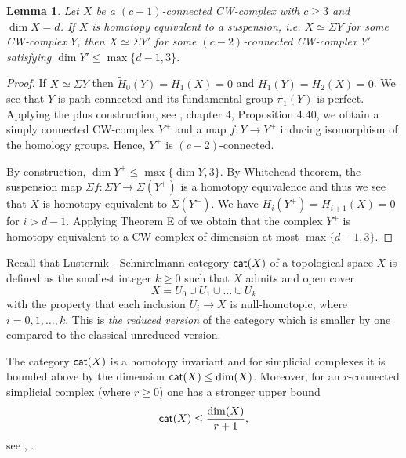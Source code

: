 \documentclass[11pt,twoside, reqno]{amsart}
\theoremstyle{plain}
\newtheorem{lema}{Lemma}
\theoremstyle{definition}
\newcommand{\cat}{{\sf{cat}}}
\begin{document}
\begin{lema}\label{lm1b}
Let $X$ be a $(c-1)$-connected CW-complex with $c\ge 3$ and $\dim X = d$. 
If $X$ is homotopy equivalent to a suspension, i.e. $X\simeq \Sigma Y$ for some CW-complex $Y$, 
then $X\simeq \Sigma Y'$ for some $(c-2)$-connected
CW-complex $Y'$ satisfying 
$\dim Y'\le \max\{d-1, 3\}$. 
\end{lema}
\begin{proof}
If $X\simeq \Sigma Y$ then $\tilde H_0(Y)= H_1(X)=0$ and $H_1(Y)= H_2(X)=0$. We see that $Y$ is path-connected and its fundamental group 
$\pi_1(Y)$ is perfect. Applying the plus construction, see \cite{Hatcher}, chapter 4, Proposition 4.40, we obtain a simply connected CW-complex 
$Y^+$ and a map $f: Y\to Y^+$ inducing isomorphism of the homology groups. Hence, $Y^+$ is $(c-2)$-connected. 

By construction, $\dim Y^+\le \max\{\dim Y, 3\}$. 
By Whitehead theorem, the suspension map $\Sigma f: \Sigma Y\to \Sigma (Y^+)$ is a homotopy equivalence and thus we see that $X$ is homotopy equivalent to $\Sigma (Y^+)$. We have $H_i(Y^+)=H_{i+1}(X)=0$ for $i>d-1$. Applying Theorem E of \cite{Wall} we obtain that the complex $Y^+$ is homotopy equivalent to a CW-complex of dimension at most $\max\{d-1, 3\}$. 
\end{proof}

Recall that  Lusternik - Schnirelmann category $\cat(X)$ of a topological space $X$ 
is defined as the smallest integer $k\ge 0$ such that $X$ admits and open cover 
$$X=U_0\cup U_1\cup \dots\cup U_k$$ with the property that each inclusion $U_i\to X$ is null-homotopic, where $i=0, 1, \dots, k$.  
This is {\it the reduced version} of the category which is smaller by one compared to the classical unreduced version. 

The category $\cat(X)$ is a homotopy invariant and for simplicial complexes it is bounded above by the dimension $\cat(X)\le \dim(X)$. Moreover, for an $r$-connected simplicial complex (where $r\ge 0$) one has a stronger upper bound
\begin{eqnarray}\label{dimupper}
\cat(X) \le \frac{\dim(X)}{r+1},
\end{eqnarray}
see \cite{Gro}, \cite{CLOT}. 
\end{document}
